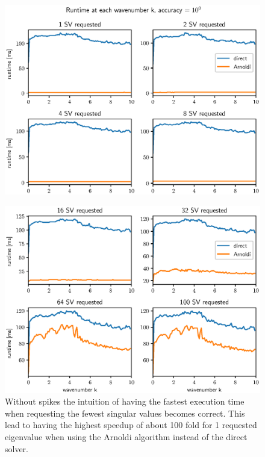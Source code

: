 \documentclass[a4paper, oneside]{thirdparty_stylesheets/discothesis}
\begin{document}
\begin{figure} [H]
	\centering
	\includegraphics[width=0.9\columnwidth]{figures/arnoldi_time_1e2_1.eps}
	\label{fig:arnoldi_time_1e2_1}
\end{figure}
\begin{figure} [H]
	\centering
	\includegraphics[width=0.9\columnwidth]{figures/arnoldi_time_1e2_2.eps}
	\caption{
		Without spikes the intuition of having the fastest execution time when requesting the fewest singular values becomes correct.
		This lead to having the highest speedup of about 100 fold for 1 requested eigenvalue when using the Arnoldi algorithm instead of the direct solver.
	}
	\label{fig:arnoldi_time_1e2_2}
\end{figure}
\end{document}
